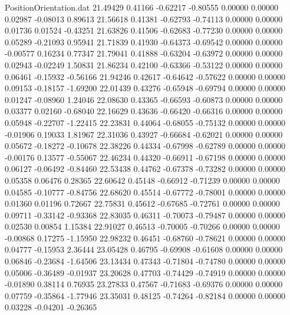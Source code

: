 \begin{filecontents}{PositionOrientation.dat}
  21.49429    0.41166   -0.62217    -0.80555    0.00000    0.00000    0.02987   -0.08013    0.89613
  21.56618    0.41381   -0.62793    -0.74113    0.00000    0.00000    0.01736    0.01524   -0.43251
  21.63826    0.41506   -0.62683    -0.77230    0.00000    0.00000    0.05289   -0.21093    0.95941
  21.71839    0.41930   -0.64373    -0.69542    0.00000    0.00000   -0.00577    0.16234    0.77347
  21.79041    0.41888   -0.63204    -0.63972    0.00000    0.00000    0.02943   -0.02249    1.50831
  21.86234    0.42100   -0.63366    -0.53122    0.00000    0.00000    0.06461   -0.15932   -0.56166
  21.94246    0.42617   -0.64642    -0.57622    0.00000    0.00000    0.09153   -0.18157   -1.69200
  22.01439    0.43276   -0.65948    -0.69794    0.00000    0.00000    0.01247   -0.08960    1.24046
  22.08630    0.43365   -0.66593    -0.60873    0.00000    0.00000    0.03377    0.02160   -0.68040
  22.16629    0.43636   -0.66420    -0.66316    0.00000    0.00000    0.05948   -0.22707   -1.22415
  22.23831    0.44064   -0.68055    -0.75132    0.00000    0.00000   -0.01906    0.19033    1.81967
  22.31036    0.43927   -0.66684    -0.62021    0.00000    0.00000    0.05672   -0.18272   -0.10678
  22.38226    0.44334   -0.67998    -0.62789    0.00000    0.00000   -0.00176    0.13577   -0.55067
  22.46234    0.44320   -0.66911    -0.67198    0.00000    0.00000    0.06127   -0.06492   -0.84460
  22.53438    0.44762   -0.67378    -0.73282    0.00000    0.00000    0.05358    0.06476    0.28365
  22.60642    0.45148   -0.66912    -0.71239    0.00000    0.00000    0.04585   -0.10777   -0.84756
  22.68620    0.45514   -0.67772    -0.78001    0.00000    0.00000    0.01360    0.01196    0.72667
  22.75831    0.45612   -0.67685    -0.72761    0.00000    0.00000    0.09711   -0.33142   -0.93368
  22.83035    0.46311   -0.70073    -0.79487    0.00000    0.00000    0.02530    0.00854    1.15384
  22.91027    0.46513   -0.70005    -0.70266    0.00000    0.00000   -0.00868    0.17275   -1.15950
  22.98232    0.46451   -0.68760    -0.78621    0.00000    0.00000    0.04777   -0.15953    2.36444
  23.05428    0.46795   -0.69908    -0.61608    0.00000    0.00000    0.06846   -0.23684   -1.64506
  23.13434    0.47343   -0.71804    -0.74780    0.00000    0.00000    0.05006   -0.36489   -0.01937
  23.20628    0.47703   -0.74429    -0.74919    0.00000    0.00000   -0.01890    0.38114    0.76935
  23.27833    0.47567   -0.71683    -0.69376    0.00000    0.00000    0.07759   -0.35864   -1.77946
  23.35031    0.48125   -0.74264    -0.82184    0.00000    0.00000    0.03228   -0.04201   -0.26365

\end{filecontents}
